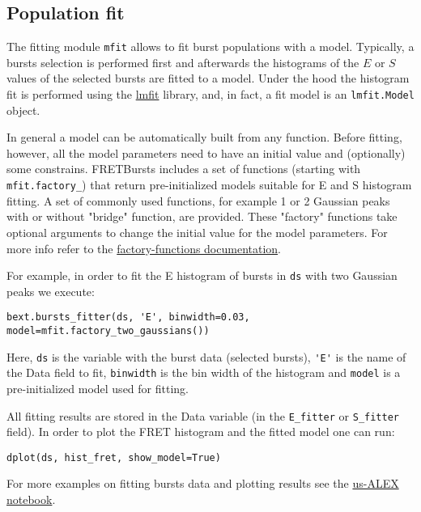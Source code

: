 \subsection{Population fit}
\label{sec:fretfit}

The fitting module \verb|mfit| allows to fit burst populations with a model.
Typically, a bursts selection is performed first and afterwards the histograms of
the $E$ or $S$ values of the selected bursts are fitted to a model. Under the
hood the histogram fit is performed using the
\href{http://lmfit.github.io/lmfit-py/}{lmfit} library, and, in fact, 
a fit model is an \verb|lmfit.Model| object.

In general a model can be automatically built from any function. Before fitting,
however, all the model parameters need to have an initial value and (optionally)
some constrains. FRETBursts includes a set of functions (starting with
\verb|mfit.factory_|) that return pre-initialized models suitable for E and S
histogram fitting. A set of commonly used functions, for example 1 or 2 Gaussian
peaks with or without "bridge" function, are provided. These "factory" functions
take optional arguments to change the initial value for the model parameters.
For more info refer to the
\href{http://fretbursts.readthedocs.org/en/latest/mfit.html#model-factory-functions}{factory-functions documentation}.

For example, in order to fit the E histogram of bursts in \verb|ds| with two
Gaussian peaks we execute:

\begin{verbatim}
bext.bursts_fitter(ds, 'E', binwidth=0.03, model=mfit.factory_two_gaussians())
\end{verbatim}

Here, \verb|ds| is the variable with the burst data (selected bursts),
\verb|'E'| is the name of the Data field to fit, \verb|binwidth| is the bin
width of the histogram and \verb|model| is a pre-initialized model used for
fitting.

All fitting results are stored in the Data variable (in the \verb|E_fitter| or
\verb|S_fitter| field).
In order to plot the FRET histogram and the fitted model one can run:

\begin{verbatim}
dplot(ds, hist_fret, show_model=True)
\end{verbatim}

For more examples on fitting bursts data and plotting results see the
\href{http://nbviewer.ipython.org/urls/raw.github.com/tritemio/FRETBursts_notebooks/master/notebooks/FRETBursts\%2520-\%2520us-ALEX\%2520smFRET\%2520burst\%2520analysis.ipynb}{us-ALEX notebook}.

